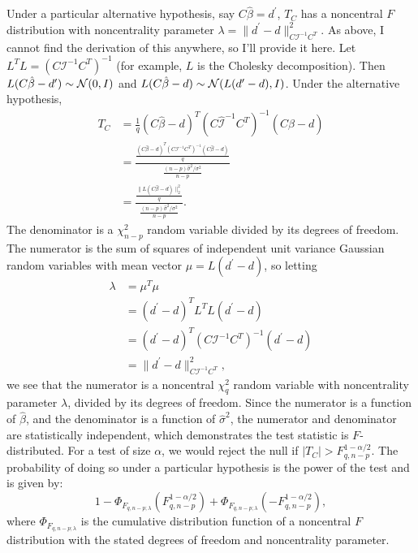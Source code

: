 \documentclass[12pt]{article}
\begin{document}
Under a particular alternative hypothesis, say $C \hat{\beta} = d^\prime$, $T_C$ has a noncentral $F$ distribution with noncentrality parameter $\lambda = \| d^\prime - d \|_{C \mathcal{I}^{-1} C^T}^2$. As above, I cannot find the derivation of this anywhere, so I'll provide it here. Let $L^T L = (C \mathcal{I}^{-1} C^T)^{-1}$ (for example, $L$ is the Cholesky decomposition). Then $L (C \hat{\beta} - d^\prime) \sim {\mathcal N}(0, I)$ and $L(C \hat{\beta} - d) \sim {\mathcal N}(L (d^\prime - d), I)$. Under the alternative hypothesis,
\begin{align*}
   T_C &= \frac{1}{q} (C \hat{\beta} - d)^T (C \hat{\mathcal{I}}^{-1} C^T)^{-1} (C \hat{\beta} - d) \\
      &= \frac{\frac{(C \hat{\beta} - d)^T (C \mathcal{I}^{-1} C^T)^{-1} (C \hat{\beta} - d)}{q}}{\frac{(n-p) \hat{\sigma}^2 / \sigma^2}{n-p}} \\
      &= \frac{\frac{\| L (C \hat{\beta} - d) \|_2^2}{q}}{\frac{(n-p) \hat{\sigma}^2 / \sigma^2}{n-p}}.
\end{align*}
The denominator is a $\chi_{n-p}^2$ random variable divided by its degrees of freedom. The numerator is the sum of squares of independent unit variance Gaussian random variables with mean vector $\mu = L (d^\prime - d)$, so letting 
\begin{align*}
   \lambda &= \mu^T \mu \\
      &= (d^\prime - d)^T L^T L (d^\prime - d) \\
      &= (d^\prime - d)^T (C \mathcal{I}^{-1} C^T)^{-1} (d^\prime - d) \\
      &= \| d^\prime - d \|_{C \mathcal{I}^{-1} C^T}^2,
\end{align*}
we see that the numerator is a noncentral $\chi_q^2$ random variable with noncentrality parameter $\lambda$, divided by its degrees of freedom. Since the numerator is a function of $\hat{\beta}$, and the denominator is a function of $\hat{\sigma}^2$, the numerator and denominator are statistically independent, which demonstrates the test statistic is $F$-distributed. For a test of size $\alpha$, we would reject the null if $|T_C| > F_{q, n-p}^{1 - \alpha/2}$. The probability of doing so under a particular hypothesis is the power of the test and is given by:
\begin{displaymath}
   1 - \Phi_{F_{q, n-p; \lambda}}(F_{q, n-p}^{1 - \alpha/2}) + \Phi_{F_{q, n-p; \lambda}}(-F_{q, n-p}^{1 - \alpha/2}),
\end{displaymath}
where $\Phi_{F_{q, n-p; \lambda}}$ is the cumulative distribution function of a noncentral $F$ distribution with the stated degrees of freedom and noncentrality parameter.
\end{document}

